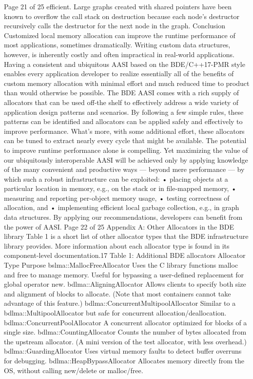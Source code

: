Page 21 of 25
efficient. Large graphs created with shared pointers have been known to
overflow the call stack on destruction because each node’s destructor
recursively calls the destructor for the next node in the graph.
Conclusion
Customized local memory allocation can improve the runtime performance of
most applications, sometimes dramatically. Writing custom data structures,
however, is inherently costly and often impractical in real-world applications.
Having a consistent and ubiquitous AASI based on the BDE/C++17-PMR style
enables every application developer to realize essentially all of the benefits of
custom memory allocation with minimal effort and much reduced time to
product than would otherwise be possible.
The BDE AASI comes with a rich supply of allocators that can be used off-the
shelf to effectively address a wide variety of application design patterns and
scenarios. By following a few simple rules, these patterns can be identified and
allocators can be applied safely and effectively to improve performance. What’s
more, with some additional effort, these allocators can be tuned to extract
nearly every cycle that might be available.
The potential to improve runtime performance alone is compelling. Yet
maximizing the value of our ubiquitously interoperable AASI will be achieved
only by applying knowledge of the many convenient and productive ways —
beyond mere performance — by which such a robust infrastructure can be
exploited:
• placing objects at a particular location in memory, e.g., on the stack or in
file-mapped memory,
• measuring and reporting per-object memory usage,
• testing correctness of allocation, and
• implementing efficient local garbage collection, e.g., in graph data
structures.
By applying our recommendations, developers can benefit from the power of
AASI.
Page 22 of 25
Appendix A: Other Allocators in the BDE library
Table 1 is a short list of other allocator types that the BDE infrastructure
library provides. More information about each allocator type is found in its
component-level documentation.17
Table 1: Additional BDE allocators
Allocator Type Purpose
bslma::MallocFreeAllocator Uses the C library functions malloc and
free to manage memory. Useful for
bypassing a user-defined replacement
for global operator new.
bdlma::AligningAllocator Allows clients to specify both size and
alignment of blocks to allocate. (Note
that most containers cannot take
advantage of this feature.)
bdlma::ConcurrentMultipoolAllocator Similar to a
bdlma::MultipoolAllocator but safe for
concurrent allocation/deallocation.
bdlma::ConcurrentPoolAllocator A concurrent allocator optimized for
blocks of a single size.
bdlma::CountingAllocator Counts the number of bytes allocated
from the upstream allocator. (A mini
version of the test allocator, with less
overhead.)
bdlma::GuardingAllocator Uses virtual memory faults to detect
buffer overruns for debugging.
bdlma::HeapBypassAllocator Allocates memory directly from the OS,
without calling new/delete or
malloc/free.

